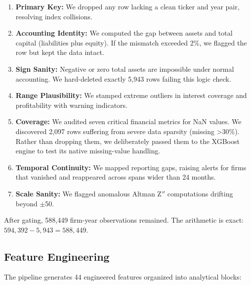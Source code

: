 \documentclass[sigconf,anonymous]{acmart}
\begin{document}
\begin{enumerate}
    \item \textbf{Primary Key:} We dropped any row lacking a clean ticker and year pair, resolving index collisions.
    \item \textbf{Accounting Identity:} We computed the gap between assets and total capital (liabilities plus equity). If the mismatch exceeded 2\%, we flagged the row but kept the data intact.
    \item \textbf{Sign Sanity:} Negative or zero total assets are impossible under normal accounting. We hard-deleted exactly 5,943 rows failing this logic check.
    \item \textbf{Range Plausibility:} We stamped extreme outliers in interest coverage and profitability with warning indicators.
    \item \textbf{Coverage:} We audited seven critical financial metrics for NaN values. We discovered 2,097 rows suffering from severe data sparsity (missing >30\%). Rather than dropping them, we deliberately passed them to the XGBoost engine to test its native missing-value handling.
    \item \textbf{Temporal Continuity:} We mapped reporting gaps, raising alerts for firms that vanished and reappeared across spans wider than 24 months.
    \item \textbf{Scale Sanity:} We flagged anomalous Altman Z$''$ computations drifting beyond $\pm$50.
\end{enumerate}

After gating, 588,449 firm-year observations remained. The arithmetic is exact: $594{,}392 - 5{,}943 = 588{,}449$.

\subsection{Feature Engineering}
The pipeline generates 44 engineered features organized into analytical blocks:
\end{document}
